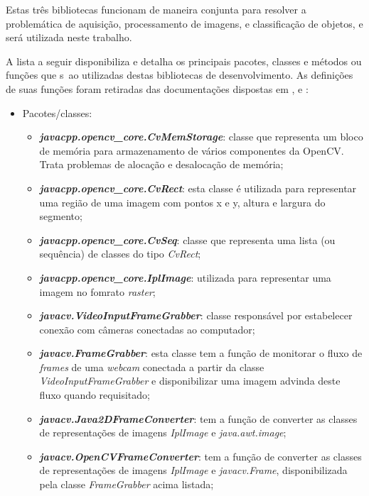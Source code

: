 Estas três bibliotecas funcionam de maneira conjunta para resolver a problemática de aquisição, processamento de imagens, e classificação de objetos, e será utilizada neste trabalho. 

A lista a seguir disponibiliza e detalha os principais pacotes, classes e métodos ou funções que s~ao utilizadas destas bibliotecas de desenvolvimento. As definições de suas funções foram retiradas das documentações dispostas em \cite{opencv}, \cite{javacv} e \cite{javacpp}: 

\begin{itemize}
	\item Pacotes/classes:
	\begin{itemize}
		\item \textit{\textbf{javacpp.opencv\_core.CvMemStorage}}: classe que representa um bloco de memória para armazenamento de vários componentes da OpenCV. Trata problemas de alocação e desalocação de memória;
		
		\item \textbf{\textit{javacpp.opencv\_core.CvRect}}: esta classe é utilizada para representar uma região de uma imagem com pontos x e y, altura e largura do segmento;
		
		\item \textbf{\textit{javacpp.opencv\_core.CvSeq}}: classe que representa uma lista (ou sequência) de classes do tipo \textit{CvRect};
		
		\item \textbf{\textit{javacpp.opencv\_core.IplImage}}: utilizada para representar uma imagem no fomrato \textit{raster};
		
		\item \textbf{\textit{javacv.VideoInputFrameGrabber}}:	classe responsável por estabelecer conexão com câmeras conectadas ao computador;

		\item \textbf{\textit{javacv.FrameGrabber}}: esta classe tem a função de monitorar o fluxo de \textit{frames} de uma \textit{webcam} conectada a partir da classe \textit{VideoInputFrameGrabber} e disponibilizar uma imagem advinda deste fluxo quando requisitado;		
			
		\item \textbf{\textit{javacv.Java2DFrameConverter}}: tem a função de converter as classes de representações de imagens \textit{IplImage} e \textit{java.awt.image};
		
		\item \textbf{\textit{javacv.OpenCVFrameConverter}}: tem a função de converter as classes de representações de imagens \textit{IplImage} e \textit{javacv.Frame}, disponibilizada pela classe \textit{FrameGrabber} acima listada;
		

\end{itemize}
\end{itemize}

